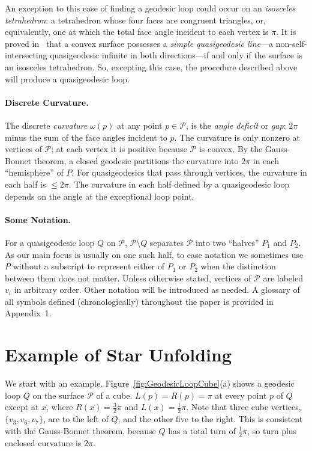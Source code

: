 \pdfoutput=1  \documentclass[]{article}
\newcommand{\seclab}[1]{\label{sec:#1}}
\newcommand{\figref}[1]{\ref{fig:#1}}
\def\P{{\mathcal P}}
\def\o{{\omega}}
\begin{document}
An exception to this ease of finding a geodesic loop could
occur on an \emph{isosceles tetrahedron}: a tetrahedron
whose four faces are congruent triangles, or, equivalently,
one at which the total face angle incident to each vertex is $\pi$.
It is proved in~\cite{iv-gcit-08} that a convex surface possesses
a \emph{simple quasigeodesic line}---a
non-self-intersecting quasigeodesic infinite in both directions---if
and only if the surface is an isosceles tetrahedron.
So, excepting this case, the procedure described above will produce a
quasigeodesic loop.





\paragraph{Discrete Curvature.}
The discrete \emph{curvature} $\o(p)$ at any point $p \in \P$,
is the \emph{angle deficit}
or \emph{gap}: $2\pi$ minus the sum of the face angles incident to $p$.
The curvature is only nonzero at vertices of $\P$;
at each vertex it is positive because $\P$ is convex.
By the Gauss-Bonnet theorem, a closed geodesic partitions the
curvature into $2\pi$ in each ``hemisphere'' of $P$.
For quasigeodesics that pass through vertices, the curvature in each
half is ${\le}2\pi$.
The curvature in each half defined by a quasigeodesic loop depends on the
angle at the exceptional loop point.


\paragraph{Some Notation.}
For a quasigeodesic loop $Q$ on $\P$,
$\P \setminus Q$ separates $\P$ into two ``halves''
$P_1$ and $P_2$.
As our main focus is usually on one such half, 
to ease notation we sometimes use $P$ without a subscript
to represent either of $P_1$ or $P_2$
when the distinction between them does not matter.
Unless otherwise stated,
vertices of $\P$ are labeled $v_i$ in arbitrary order.
Other notation will be introduced as needed.
A glossary of all symbols defined (chronologically) 
throughout the paper is provided in Appendix~1.



\section{Example of Star Unfolding}
\seclab{Example}
We start with an example.
Figure~\figref{GeodesicLoopCube}(a) shows a geodesic loop
$Q$ on the surface $\P$ of a cube.
$L(p){=}R(p)=\pi$ at every point $p$ of $Q$ except at
$x$, where $R(x){=}\frac{3}{2}\pi$ and  $L(x){=}\frac{1}{2}\pi$.
Note that three cube vertices, $\{v_3,v_6,v_7\}$, are to the left
of $Q$, and the other five to the right.
This is consistent with the Gauss-Bonnet theorem, because
$Q$ has a total turn of $\frac{1}{2}\pi$,
so turn plus enclosed curvature is $2\pi$.
\end{document}
